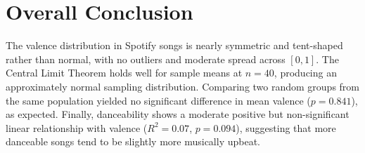 \documentclass[12pt]{article}
\begin{document}
\section*{Overall Conclusion}
The valence distribution in Spotify songs is nearly symmetric and tent-shaped rather than normal, with no outliers and moderate spread across $[0, 1]$. The Central Limit Theorem holds well for sample means at $n = 40$, producing an approximately normal sampling distribution. Comparing two random groups from the same population yielded no significant difference in mean valence ($p = 0.841$), as expected. Finally, danceability shows a moderate positive but non-significant linear relationship with valence ($R^2 = 0.07$, $p = 0.094$), suggesting that more danceable songs tend to be slightly more musically upbeat.
\end{document}

